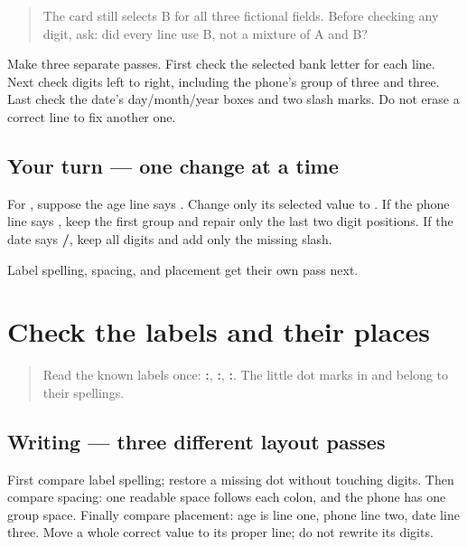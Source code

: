 \label{lesson:PA-W10-form-repair-values}



\begin{quote}
The card \textbf{} still selects B for all three fictional fields. Before checking any digit, ask: did every line use B, not a mixture of A and B?
\end{quote}

\begin{grammarlens}[title={Grammar lens — selection, order, format}]
Make three separate passes. First check the selected bank letter for each line. Next check digits left to right, including the phone's group of three and three. Last check the date's day/month/year boxes and two slash marks. Do not erase a correct line to fix another one.
\end{grammarlens}

\subsection*{Your turn — one change at a time}
For \textbf{}, suppose the age line says \textbf{}. Change only its selected value to \textbf{}. If the phone line says \textbf{ }, keep the first group and repair only the last two digit positions. If the date says \textbf{/}, keep all digits and add only the missing slash.

\begin{tcolorbox}[breakable,colback=teal!4,colframe=teal!35!black,title={Before you move on}]
Label spelling, spacing, and placement get their own pass next.
\end{tcolorbox}
\section[\texorpdfstring{\pa{ਉਮਰ}: · \pa{ਫ਼ੋਨ} … (label and …)}{ਉਮਰ: · ਫ਼ੋਨ … (label and …)}]{Check the labels and their places}

\label{lesson:PA-W10-form-repair-layout}



\begin{quote}
Read the known labels once: \textbf{:}, \textbf{:}, \textbf{:}. The little dot marks in \textbf{} and \textbf{} belong to their spellings.
\end{quote}

\subsection*{Writing — three different layout passes}
First compare label spelling; restore a missing dot without touching digits. Then compare spacing: one readable space follows each colon, and the phone has one group space. Finally compare placement: age is line one, phone line two, date line three. Move a whole correct value to its proper line; do not rewrite its digits.

